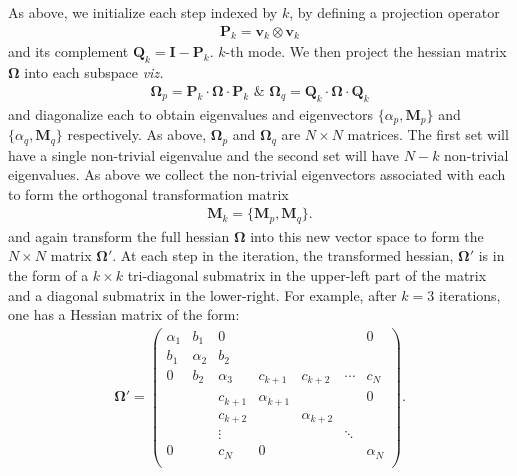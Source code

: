 As above, we initialize each step indexed by $k$,  by defining a projection operator
\begin{eqnarray}
{\mathbf P}_{k} = {\mathbf v}_{k}\otimes  {\mathbf v}_{k}
\end{eqnarray}
and its complement ${\mathbf Q}_{k} = {\mathbf I}  - {\mathbf P}_{k}$.
$k$-th mode.
We then project the hessian matrix $\mathbf\Omega$ into each subspace {\em viz.}
\begin{eqnarray}
\mathbf\Omega_{p} = \mathbf P_{k}\cdot \mathbf\Omega \cdot \mathbf P_{k} \,\, \& \,\, \mathbf\Omega_{q} = \mathbf Q_{k}\cdot \mathbf\Omega \cdot  \mathbf Q_{k}
\end{eqnarray}
and diagonalize each to obtain eigenvalues and eigenvectors $\{\alpha_{p}, {\mathbf M}_{p}\}$ and $\{\alpha_{q}, {\mathbf M}_{q}\}$
respectively.
As above, $\mathbf\Omega_{p} $ and $\mathbf\Omega_{q}$ are $N\times N$ matrices.
The first set will have a single
non-trivial eigenvalue and the second set
will have $N-k$ non-trivial eigenvalues.  As above we collect the non-trivial eigenvectors associated with each
to form the orthogonal transformation matrix
\begin{eqnarray}
{\mathbf M}_{k} = \{{\mathbf M}_{p},{\mathbf M}_{q}\}.
\end{eqnarray}
and again transform the full hessian $\mathbf\Omega$ into this new vector space to form the $N\times N$ matrix $\mathbf\Omega'$.
 At each step in the iteration, the transformed hessian, $\mathbf\Omega'$ is in the form of a
$k\times k$ tri-diagonal submatrix in the upper-left part of the matrix and
a diagonal submatrix in the lower-right.  For example, after $k=3$ iterations, one has
a Hessian matrix of the form:
\begin{eqnarray}
{\mathbf\Omega}' =
\begin{pmatrix}
\alpha_{1}   & b_{1}    & 0                    &               &             &            & 0 \\
b_{1}     & \alpha_{2}  & b_{2}                         \\
0            &   b_{2}         & \alpha_{3}    &   c_{k+1}   & c_{k+2}  & \cdots & c_{N}     \\
               &                     &           c_{k+1}           &     \alpha_{k+ 1} & &             & 0                 \\
               &                     &           c_{k+2}           &                 & \alpha_{k+2}  \\
               &                     &          \vdots           &                 &                    &  \ddots \\
   0           &                     &           c_{N}           &     0   &&& \alpha_{N}\\
\end{pmatrix}.
\label{omega-prime}
\end{eqnarray}
